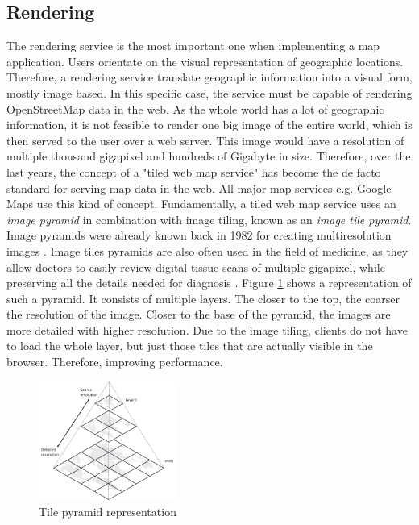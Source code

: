 \documentclass[conference]{IEEEtran}
\begin{document}
\subsection{Rendering}
\label{subsec:Rendering}
The rendering service is the most important one when implementing a map application. Users orientate on the visual representation of geographic locations. Therefore, a rendering service translate geographic information into a visual form, mostly image based. In this specific case, the service must be capable of rendering OpenStreetMap data in the web. As the whole world has a lot of geographic information, it is not feasible to render one big image of the entire world, which is then served to the user over a web server. This image would have a resolution of multiple thousand gigapixel and hundreds of Gigabyte in size. Therefore, over the last years, the concept of a "tiled web map service" has become the de facto standard for serving map data in the web. All major map services e.g. Google Maps use this kind of concept. Fundamentally, a tiled web map service uses an \textit{image pyramid} in combination with image tiling, known as an \textit{image tile pyramid}. \cite{garcia12} Image pyramids were already known back in 1982 for creating multiresolution images \cite{in_e_1984}. Image tiles pyramids are also often used in the field of medicine, as they allow doctors to easily review digital tissue scans of multiple gigapixel, while preserving all the details needed for diagnosis \cite{Neemann2021}.
Figure \ref{fig:tile_pyramid} shows a representation of such a pyramid. It consists of multiple layers. The closer to the top, the coarser the resolution of the image. Closer to the base of the pyramid, the images are more detailed with higher resolution. Due to the image tiling, clients do not have to load the whole layer, but just those tiles that are actually visible in the browser. Therefore, improving performance. \cite{garcia12}\cite{netek_performance_2020}
\begin{figure}[h]
    \centering
    \includegraphics[width=0.4\textwidth]{figures/TilePyramid.jpg}
    \caption{Tile pyramid representation \cite{garcia12}}
    \label{fig:tile_pyramid}
\end{figure}
\end{document}
